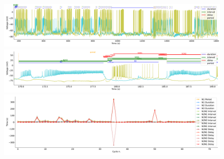 %






\begin{figure}[htbp]
	\centering
	\begin{minipage}[b]{\textwidth}
		\centering
		\includegraphics[width=\textwidth,height=0.1\textheight]{./invariants/data/SUSSEX/prep3/images/prep3_3phases_signal_intervals_zoom.pdf}
		\includegraphics[width=\textwidth]{./invariants/data/SUSSEX/prep3/images/prep3_3phases_signal_intervals_cycle.pdf}
		\includegraphics[width=\textwidth]{./invariants/data/SUSSEX/prep3/images/prep3_3phases_time_cycle.pdf}
	\end{minipage}
	\centering
	\begin{minipage}[b]{0.45\textwidth}
		\centering

\end{minipage}
\end{figure}
